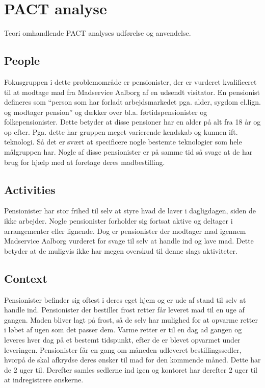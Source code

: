 \section{PACT analyse}
Teori omhandlende PACT analyses udførelse og anvendelse.

\subsection{People}
Fokusgruppen i dette problemområde er pensionister, der er vurderet kvalificeret til at modtage mad fra Madservice Aalborg af en udsendt visitator.
En pensionist defineres som ``person som har forladt arbejdsmarkedet pga. alder, sygdom el.lign. og modtager pension'' og dækker over bl.a. førtidspensionister og folkepensionister\cite{ordnet_pensionist}.
Dette betyder at disse pensioner har en alder på alt fra 18 år og op efter.
Pga. dette har gruppen meget varierende kendskab og kunnen ift. teknologi.
Så det er svært at specificere nogle bestemte teknologier som hele målgruppen har.
Nogle af disse pensionister er på samme tid så svage at de har brug for hjælp med at foretage deres madbestilling.

\subsection{Activities}
Pensionister har stor frihed til selv at styre hvad de laver i dagligdagen, siden de ikke arbejder.
Nogle pensionister forholder sig fortsat aktive og deltager i arrangementer eller lignende.
Dog er pensionister der modtager mad igennem Madservice Aalborg vurderet for svage til selv at handle ind og lave mad.
Dette betyder at de muligvis ikke har megen overskud til denne slags aktiviteter.

\subsection{Context}
Pensionister befinder sig oftest i deres eget hjem og er ude af stand til selv at handle ind. 
Pensionister der bestiller frost retter får leveret mad til en uge af gangen.
Maden bliver lagt på frost, så de selv har mulighed for at opvarme retter i løbet af ugen som det passer dem.
Varme retter er til en dag ad gangen og leveres hver dag på et bestemt tidspunkt, efter de er blevet opvarmet under leveringen. 
Pensionister får en gang om måneden udleveret bestillingssedler, hvorpå de skal afkrydse deres ønsker til mad for den kommende måned.
Dette har de 2 uger til.
Derefter samles sedlerne ind igen og kontoret har derefter 2 uger til at indregistrere ønskerne.

